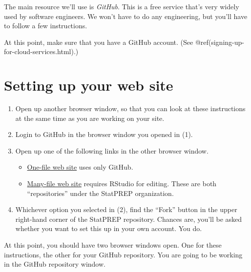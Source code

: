 \documentclass[]{book}
\providecommand{\tightlist}{%
  \setlength{\itemsep}{0pt}\setlength{\parskip}{0pt}}
\theoremstyle{definition}
\theoremstyle{definition}
\theoremstyle{definition}
\theoremstyle{remark}
\begin{document}
The main resource we'll use is \emph{GitHub}. This is a free service
that's very widely used by software engineers. We won't have to do any
engineering, but you'll have to follow a few instructions.

At this point, make sure that you have a GitHub account. (See
@ref(signing-up-for-cloud-services.html).)

\section{Setting up your web site}\label{setting-up-your-web-site}

\begin{enumerate}
\def\labelenumi{\arabic{enumi}.}
\tightlist
\item
  Open up another browser window, so that you can look at these
  instructions at the same time as you are working on your site.
\item
  Login to GitHub in the browser window you opened in (1).
\item
  Open up one of the following links in the other browser window.

  \begin{itemize}
  \tightlist
  \item
    \href{https://github.com/StatPREP/one-page-website}{One-file web
    site} uses only GitHub.
  \item
    \href{https://github.com/StatPREP/website-template}{Many-file web
    site} requires RStudio for editing. These are both ``repositories''
    under the StatPREP organization.
  \end{itemize}
\item
  Whichever option you selected in (2), find the ``Fork'' button in the
  upper right-hand corner of the StatPREP repository. Chances are,
  you'll be asked whether you want to set this up in your own account.
  You do.
\end{enumerate}

At this point, you should have two browser windows open. One for these
instructions, the other for your GitHub repository. You are going to be
working in the GitHub repository window.
\end{document}

